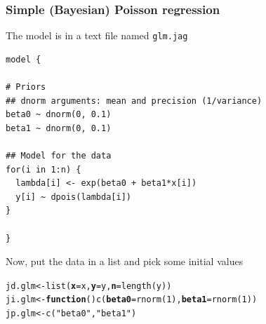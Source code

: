 \documentclass[color=usenames,dvipsnames]{beamer}\usepackage[]{graphicx}\usepackage[]{xcolor}
\makeatletter
\newcommand{\hlnum}[1]{\textcolor[rgb]{0.69,0.494,0}{#1}}%
\newcommand{\hlstr}[1]{\textcolor[rgb]{0.749,0.012,0.012}{#1}}%
\newcommand{\hlstd}[1]{\textcolor[rgb]{0,0,0}{#1}}%
\newcommand{\hlkwa}[1]{\textcolor[rgb]{0,0,0}{\textbf{#1}}}%
\newcommand{\hlkwb}[1]{\textcolor[rgb]{0,0.341,0.682}{#1}}%
\newcommand{\hlkwc}[1]{\textcolor[rgb]{0,0,0}{\textbf{#1}}}%
\newcommand{\hlkwd}[1]{\textcolor[rgb]{0.004,0.004,0.506}{#1}}%
\newenvironment{kframe}{%
 \def\at@end@of@kframe{}%
 \ifinner\ifhmode%
  \def\at@end@of@kframe{\end{minipage}}%
  \begin{minipage}{\columnwidth}%
 \fi\fi%
 \def\FrameCommand##1{\hskip\@totalleftmargin \hskip-\fboxsep
 \colorbox{shadecolor}{##1}\hskip-\fboxsep
     \hskip-\linewidth \hskip-\@totalleftmargin \hskip\columnwidth}%
 \MakeFramed {\advance\hsize-\width
   \@totalleftmargin\z@ \linewidth\hsize
   \@setminipage}}%
 {\par\unskip\endMakeFramed%
 \at@end@of@kframe}
\newenvironment{knitrout}{}{} %
\makeatother
\begin{document}
\begin{frame}[fragile]
  \frametitle{Simple (Bayesian) Poisson regression}
  \small
  The model is in a text file named {\tt glm.jag} \\
\begin{knitrout}\scriptsize
{}\color{fgcolor}\begin{kframe}
\begin{verbatim}
model {

# Priors
## dnorm arguments: mean and precision (1/variance)
beta0 ~ dnorm(0, 0.1)  
beta1 ~ dnorm(0, 0.1)

## Model for the data
for(i in 1:n) {
  lambda[i] <- exp(beta0 + beta1*x[i])
  y[i] ~ dpois(lambda[i])
}

}
\end{verbatim}
\end{kframe}
\end{knitrout}
\pause
\vfill
Now, put the data in a list and pick some initial values
\begin{knitrout}
\color{fgcolor}\begin{kframe}
\begin{alltt}
\hlstd{jd.glm} \hlkwb{<-} \hlkwd{list}\hlstd{(}\hlkwc{x}\hlstd{=x,} \hlkwc{y}\hlstd{=y,} \hlkwc{n}\hlstd{=}\hlkwd{length}\hlstd{(y))}
\hlstd{ji.glm} \hlkwb{<-} \hlkwa{function}\hlstd{()} \hlkwd{c}\hlstd{(}\hlkwc{beta0}\hlstd{=}\hlkwd{rnorm}\hlstd{(}\hlnum{1}\hlstd{),} \hlkwc{beta1}\hlstd{=}\hlkwd{rnorm}\hlstd{(}\hlnum{1}\hlstd{))}
\hlstd{jp.glm} \hlkwb{<-} \hlkwd{c}\hlstd{(}\hlstr{"beta0"}\hlstd{,} \hlstr{"beta1"}\hlstd{)}
\end{alltt}
\end{kframe}
\end{knitrout}
\end{frame}
\end{document}
